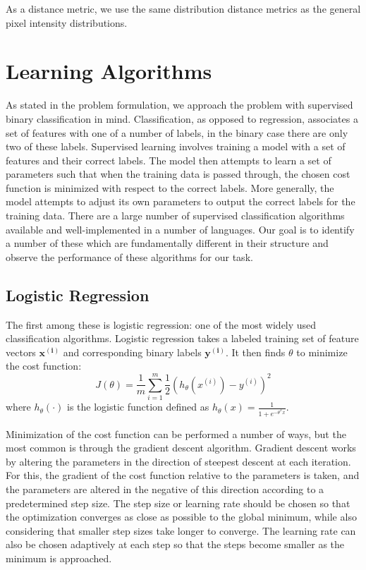 As a distance metric, we use the same distribution distance metrics as the general pixel intensity distributions.


\section{Learning Algorithms}

As stated in the problem formulation, we approach the problem with supervised binary classification in mind.
Classification, as opposed to regression, associates a set of features with one of a number of labels, in the binary case there are only two of these labels.
Supervised learning involves training a model with a set of features and their correct labels.
The model then attempts to learn a set of parameters such that when the training data is passed through, the chosen cost function is minimized with respect to the correct labels.
More generally, the model attempts to adjust its own parameters to output the correct labels for the training data.
There are a large number of supervised classification algorithms available and well-implemented in a number of languages.
Our goal is to identify a number of these which are fundamentally different in their structure and observe the performance of these algorithms for our task.


\subsection{Logistic Regression}

The first among these is logistic regression: one of the most widely used classification algorithms.
Logistic regression takes a labeled training set of feature vectors $\mathbf{x^{(i)}}$ and corresponding binary labels $\mathbf{y^{(i)}}$.
It then finds $\theta$ to minimize the cost function:
\begin{equation}
J(\theta) = \frac{1}{m} \sum_{i=1}^m\frac{1}{2} \left( h_\theta \left( x^{(i)} \right) - y^{(i)} \right)^2
\end{equation}
where $h_\theta (\cdot)$ is the logistic function defined as $h_\theta(x) = \frac{1}{1+e^{-\theta^Tx}}$.

Minimization of the cost function can be performed a number of ways, but the most common is through the gradient descent algorithm.
Gradient descent works by altering the parameters in the direction of steepest descent at each iteration.
For this, the gradient of the cost function relative to the parameters is taken, and the parameters are altered in the negative of this direction according to a predetermined step size.
The step size or learning rate should be chosen so that the optimization converges as close as possible to the global minimum, while also considering that smaller step sizes take longer to converge.
The learning rate can also be chosen adaptively at each step so that the steps become smaller as the minimum is approached.


